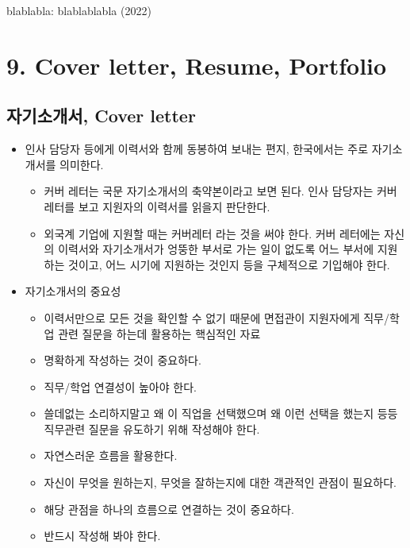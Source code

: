 \documentclass{article}
\begin{document}
\begin{thebibliography}{99}
     blablabla: blablablabla (2022)
\end{thebibliography}

\section{9. Cover letter, Resume, Portfolio}
\subsection{자기소개서, Cover letter}
\begin{itemize}
    \item 인사 담당자 등에게 이력서와 함께 동봉하여 보내는 편지, 한국에서는 주로 자기소개서를 의미한다.
    \begin{itemize}
        \item 커버 레터는 국문 자기소개서의 축약본이라고 보면 된다. 인사 담당자는 커버 레터를 보고 지원자의 이력서를 읽을지 판단한다.~\cite{c1} 
        \item 외국계 기업에 지원할 때는 커버레터 라는 것을 써야 한다. 커버 레터에는 자신의 이력서와 자기소개서가 엉뚱한 부서로 가는 일이 없도록 어느 부서에 지원하는 것이고, 어느 시기에 지원하는 것인지 등을 구체적으로 기입해야 한다.~\cite{c2}
    \end{itemize}
    \item 자기소개서의 중요성
    \begin{itemize}
        \item 이력서만으로 모든 것을 확인할 수 없기 때문에 면접관이 지원자에게 직무/학업 관련 질문을 하는데 활용하는 핵심적인 자료
        \item 명확하게 작성하는 것이 중요하다.
        \item 직무/학업 연결성이 높아야 한다.
        \item 쓸데없는 소리하지말고 왜 이 직업을 선택했으며 왜 이런 선택을 했는지 등등 직무관련 질문을 유도하기 위해 작성해야 한다.
        \item 자연스러운 흐름을 활용한다.
        \item 자신이 무엇을 원하는지, 무엇을 잘하는지에 대한 객관적인 관점이 필요하다.
        \item 해당 관점을 하나의 흐름으로 연결하는 것이 중요하다.
        \item 반드시 작성해 봐야 한다.
    \end{itemize}
\end{itemize}
\end{document}
